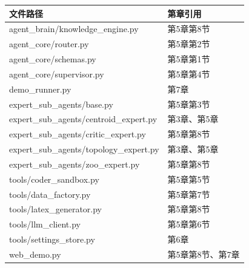 \documentclass[11pt,a4paper]{ctexbook}
\begin{document}
\begin{longtable}{p{5.5cm} p{7.5cm}}
    \toprule
    \textbf{文件路径} & \textbf{第章引用} \\
    \midrule
    agent\_brain/knowledge\_engine.py & 第5章第8节 \\
    \midrule
    agent\_core/router.py & 第5章第2节 \\
    \midrule
    agent\_core/schemas.py & 第5章第1节 \\
    \midrule
    agent\_core/supervisor.py & 第5章第4节 \\
    \midrule
    demo\_runner.py & 第7章 \\
    \midrule
    expert\_sub\_agents/base.py & 第5章第3节 \\
    \midrule
    expert\_sub\_agents/centroid\_expert.py & 第3章、第5章 \\
    \midrule
    expert\_sub\_agents/critic\_expert.py & 第5章第8节 \\
    \midrule
    expert\_sub\_agents/topology\_expert.py & 第3章、第5章 \\
    \midrule
    expert\_sub\_agents/zoo\_expert.py & 第5章第8节 \\
    \midrule
    tools/coder\_sandbox.py & 第5章第5节 \\
    \midrule
    tools/data\_factory.py & 第5章第7节 \\
    \midrule
    tools/latex\_generator.py & 第5章第8节 \\
    \midrule
    tools/llm\_client.py & 第5章第6节 \\
    \midrule
    tools/settings\_store.py & 第6章 \\
    \midrule
    web\_demo.py & 第5章第8节、第7章 \\
    \bottomrule
\end{longtable}
\end{document}
